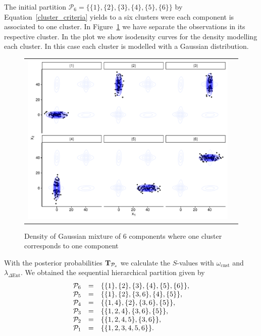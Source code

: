 \documentclass[submit]{smj}
\theoremstyle{definition}
\begin{document}
The initial partition  $\mathcal{P}_6 = \{ \{1\},\{2\}, \{3\}, \{4\}, \{5\}, \{6\} \}$  by Equation~\ref{cluster_criteria} yields to a six clusters were each component is associated to one cluster. In Figure~\ref{ex_one_one} we have separate the observations in its respective cluster. In the plot we show isodensity curves for the density modelling each cluster. In this case each cluster is modelled with a Gaussian distribution.

\begin{figure}[h]
\begin{center}
\begin{tabular}{cc}
  \includegraphics[width=\textwidth]{figures/partition-example-part6.pdf} \\
 \end{tabular}
 \caption{Density of Gaussian mixture of 6 components where one cluster corresponds to one component}\label{ex_one_one}
\end{center}
\end{figure}

With the posterior probabilities $\text{\textbf{T}}_{\mathcal{P}_s}$ we calculate the $S$-values with $\omega_{\text{cnst}}$ and $\lambda_{\Delta\text{Ent}}$. We obtained the sequential hierarchical partition given by 
\begin{equation}
\begin{array}{r c l}
\mathcal{P}_6 &=& \{\{1\},\{2\},\{3\},\{4\},\{5\},\{6\}\},\\
\mathcal{P}_5 &=& \{\{1\},\{2\}, \{3, 6\},\{4\},\{5\} \},\\
\mathcal{P}_4 &=& \{\{1, 4\},\{2\}, \{3, 6\}, \{5\} \}, \\
\mathcal{P}_3 &=& \{\{1, 2, 4\}, \{3, 6\}, \{5\} \}, \\
\mathcal{P}_2 &=& \{\{1, 2 , 4, 5\}, \{3, 6\} \},  \\
\mathcal{P}_1 &=& \{\{1, 2, 3, 4, 5, 6\}\}.
\end{array}
\label{hier_ex}
\end{equation}
\end{document}
